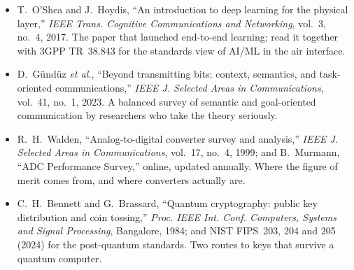 \begin{itemize}
and Y.~Xiong \emph{et al.}, ``On the fundamental tradeoff of integrated sensing and communications
under Gaussian channels,'' \emph{IEEE Trans. Information Theory}, vol.~69, no.~9, 2023. The ISAC survey
and the deterministic--random trade-off.
\item T.~O'Shea and J.~Hoydis, ``An introduction to deep learning for the physical layer,''
\emph{IEEE Trans. Cognitive Communications and Networking}, vol.~3, no.~4, 2017. The paper that launched
end-to-end learning; read it together with 3GPP TR~38.843 for the standards view of AI/ML in the air
interface.
\item D.~G\"und\"uz \emph{et al.}, ``Beyond transmitting bits: context, semantics, and task-oriented
communications,'' \emph{IEEE J. Selected Areas in Communications}, vol.~41, no.~1, 2023. A balanced
survey of semantic and goal-oriented communication by researchers who take the theory seriously.
\item R.~H.~Walden, ``Analog-to-digital converter survey and analysis,'' \emph{IEEE J. Selected Areas in
Communications}, vol.~17, no.~4, 1999; and B.~Murmann, ``ADC Performance Survey,'' online, updated
annually. Where the figure of merit comes from, and where converters actually are.
\item C.~H.~Bennett and G.~Brassard, ``Quantum cryptography: public key distribution and coin tossing,''
\emph{Proc. IEEE Int. Conf. Computers, Systems and Signal Processing}, Bangalore, 1984; and NIST FIPS~203,
204 and 205 (2024) for the post-quantum standards. Two routes to keys that survive a quantum computer.
\end{itemize}
